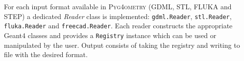 \documentclass[final,5p,times,twocolumn]{elsarticle}
\newcommand{\PYGEOMETRY}{\textsc{Pyg4ometry}}
\begin{document}
%
    

For each input format available in \PYGEOMETRY{}  (GDML, STL, FLUKA and STEP) a dedicated \emph{Reader} class is implemented: \verb|gdml.Reader|,
\verb|stl.Reader|, \verb|fluka.Reader| and \verb|freecad.Reader|. Each reader constructs the appropriate Geant4 classes and provides a \verb|Registry| instance which 
can be used or manipulated by the user. 
Output consists of taking the registry and writing to file with the desired format.
\end{document}
